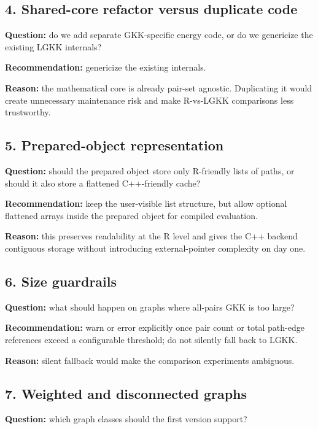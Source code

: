 \documentclass[11pt]{article}
\begin{document}
\subsection*{4. Shared-core refactor versus duplicate code}

\textbf{Question:} do we add separate GKK-specific energy code, or do we
genericize the existing LGKK internals?

\textbf{Recommendation:} genericize the existing internals.

\textbf{Reason:} the mathematical core is already pair-set agnostic. Duplicating
it would create unnecessary maintenance risk and make R-vs-LGKK comparisons less
trustworthy.

\subsection*{5. Prepared-object representation}

\textbf{Question:} should the prepared object store only R-friendly lists of
paths, or should it also store a flattened C++-friendly cache?

\textbf{Recommendation:} keep the user-visible list structure, but allow optional
flattened arrays inside the prepared object for compiled evaluation.

\textbf{Reason:} this preserves readability at the R level and gives the C++
backend contiguous storage without introducing external-pointer complexity on day
one.

\subsection*{6. Size guardrails}

\textbf{Question:} what should happen on graphs where all-pairs GKK is too large?

\textbf{Recommendation:} warn or error explicitly once pair count or total
path-edge references exceed a configurable threshold; do not silently fall back
to LGKK.

\textbf{Reason:} silent fallback would make the comparison experiments ambiguous.

\subsection*{7. Weighted and disconnected graphs}

\textbf{Question:} which graph classes should the first version support?
\end{document}

